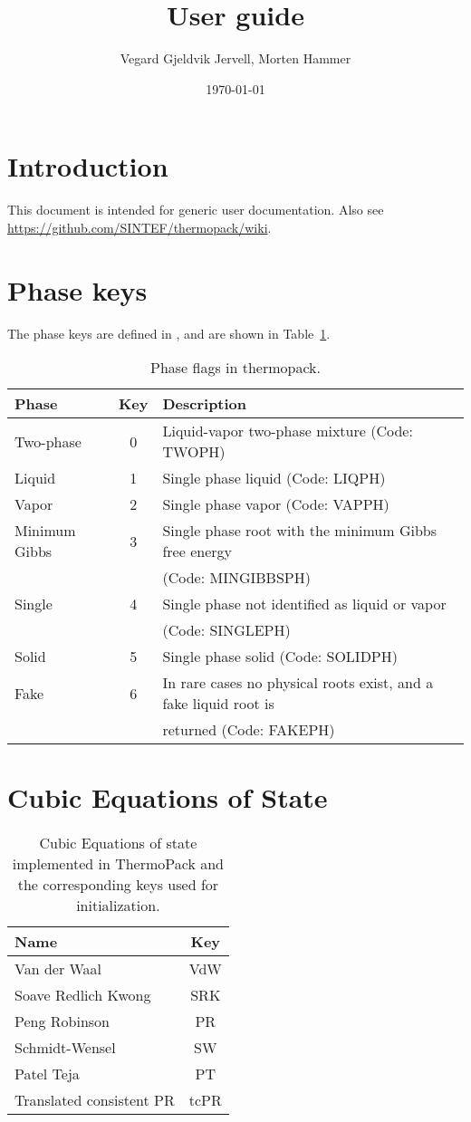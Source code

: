 \documentclass[english]{../thermomemo/thermomemo}
\title{User guide}
\author{Vegard Gjeldvik Jervell, Morten Hammer}
\date{\today}
\begin{document}
\frontmatter
\tableofcontents

\section{Introduction}
This document is intended for generic user documentation. Also see
\url{https://github.com/SINTEF/thermopack/wiki}.

\section{Phase keys}
The phase keys are defined in ,
and are shown in Table~\ref{tab:phase_flags_thermopack}.
\begin{table}[ht!]
  \centering
  \begin{tabular}{l c l}
    \toprule
    Phase & Key & Description\\
    \midrule
    Two-phase & 0 & Liquid-vapor two-phase mixture (Code: TWOPH)\\
    Liquid & 1 & Single phase liquid (Code: LIQPH) \\
    Vapor & 2 & Single phase vapor (Code: VAPPH) \\
    Minimum Gibbs & 3 & Single phase root with the minimum Gibbs free energy \\ & & (Code: MINGIBBSPH) \\
    Single & 4 & Single phase not identified as liquid or vapor \\ & & (Code: SINGLEPH) \\
    Solid & 5 & Single phase solid (Code: SOLIDPH) \\
    Fake & 6 & In rare cases no physical roots exist, and a fake liquid root is \\ & & returned (Code: FAKEPH) \\
    \bottomrule
  \end{tabular}
  \caption{Phase flags in thermopack.}
  \label{tab:phase_flags_thermopack}
\end{table}

\section{Cubic Equations of State}

\begin{table}[ht!]
  \centering
  \begin{tabular}{l c }
    \toprule
    Name & Key \\
    \midrule
    Van der Waal & VdW\\
    Soave Redlich Kwong & SRK\\
    Peng Robinson & PR\\
    Schmidt-Wensel & SW\\
    Patel Teja & PT\\
    Translated consistent PR & tcPR\\
    \bottomrule
  \end{tabular}
  \caption{Cubic Equations of state implemented in ThermoPack and the corresponding keys used for initialization.}
  \label{tab:EoS_thermopack}
\end{table}
\end{document}
